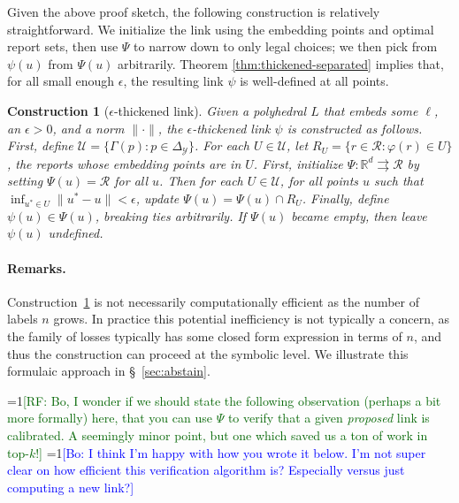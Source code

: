 \documentclass[11pt]{article}
\newcommand{\Comments}{1}
\newcommand{\mynote}[2]{\ifnum\Comments=1\textcolor{#1}{#2}\fi}
\newcommand{\raf}[1]{\mynote{darkgreen}{[RF: #1]}}
\newcommand{\proposedadd}[1]{\mynote{orange}{#1}}
\newcommand{\bo}[1]{\mynote{blue}{[Bo: #1]}}
\newcommand{\reals}{\mathbb{R}}
\newcommand{\simplex}{\Delta_\Y}
\newcommand{\R}{\mathcal{R}}
\newcommand{\U}{\mathcal{U}}
\newcommand{\Y}{\mathcal{Y}}
\newcommand{\toto}{\rightrightarrows}
\newtheorem{construction}{Construction}
\begin{document}
Given the above proof sketch, the following construction is relatively straightforward.
We initialize the link using the embedding points and optimal report sets, then use $\Psi$ to narrow down to only legal choices; we then pick from $\psi(u)$ from $\Psi(u)$ arbitrarily.
Theorem \ref{thm:thickened-separated} implies that, for all small enough $\epsilon$, the resulting link $\psi$ is well-defined at all points.
\begin{construction}[$\epsilon$-thickened link] \label{const:eps-thick-link}
  Given a polyhedral $L$ that embeds some $\ell$, an $\epsilon > 0$, and a norm $\|\cdot\|$, the \emph{$\epsilon$-thickened link} $\psi$ is constructed as follows.
  First, define $\U = \{\Gamma(p) : p \in \simplex\}$.
  For each $U \in \U$, let $R_U = \{r \in \R : \varphi(r) \in U\}$, the reports whose embedding points are in $U$.
  First, initialize $\Psi: \reals^d \toto \R$ by setting $\Psi(u) = \R$ for all $u$.
  Then for each $U \in \U$, for all points $u$ such that $\inf_{u^* \in U} \|u^*-u\| < \epsilon$, update $\Psi(u) = \Psi(u) \cap R_U$.
  Finally, define $\psi(u) \in \Psi(u)$, breaking ties arbitrarily.
  If $\Psi(u)$ became empty, then leave $\psi(u)$ undefined.
\end{construction}

\paragraph{Remarks.}
Construction~\ref{const:eps-thick-link} is not necessarily computationally efficient as the number of labels $n$ grows.
In practice this potential inefficiency is not typically a concern, as the family of losses typically has some closed form expression in terms of $n$, and thus the construction can proceed at the symbolic level.
We illustrate this formulaic approach in \S~\ref{sec:abstain}.

\raf{Bo, I wonder if we should state the following observation (perhaps a bit more formally) here, that you can use $\Psi$ to verify that a given \emph{proposed} link is calibrated.  A seemingly minor point, but one which saved us a ton of work in top-$k$!}
\bo{I think I'm happy with how you wrote it below. I'm not super clear on how efficient this verification algorithm is? Especially versus just computing a new link?}
\end{document}
